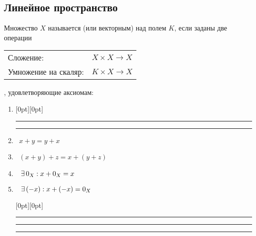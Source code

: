 \subsection{Линейное пространство}

\begin{opr} %
	Множество $X$ называется  (или векторным) над полем $K$, если заданы две операции\\[5pt]
	\begin{tabular}{ll}
		Сложение: & $X \times X \to X$ \quad {\small $\bigl((x, y) \mapsto x + y\bigr)$}\\
		Умножение на скаляр: & $K \times X \to X$ \quad {\small$\bigl((\alpha, x\bigr) \mapsto \alpha \cdot x)$}\\
	\end{tabular},
	удовлетворяющие аксиомам:
	\begin{enumerate} %
		\item[]\hspace{-2em}\vspace{-.75em}
		\raisebox{0pt}[0pt][0pt]%
		{%
			\rule[2pt]{4.843cm}{0.1pt}%
			\fboxrule=0.1pt%
			\fboxsep=2.5pt%
			\rule[2pt]{4.843cm}{0.1pt}%
		}%
		\vspace{.4em}
		\item {} \ $x + y = y + x$ 
		
		\item {} \ $(x + y) + z = x + (y + z)$
		
		\item {}$\E 0_X : x + 0_X = x$
		
		\item {}$\E (-x) : x + (-x) = 0_X $
		
		\vspace{-1.6ex}\hspace{-2em}
		\raisebox{0pt}[0pt][0pt]%
		{%
			\rule[2pt]{0.1pt}{2.55cm}%
			\rule[2pt]{15.1cm}{0.2pt}%
			\rule[2pt]{0.1pt}{2.55cm}%
		}%
		\vspace{-.9ex}
		

\end{enumerate}
\end{opr}
